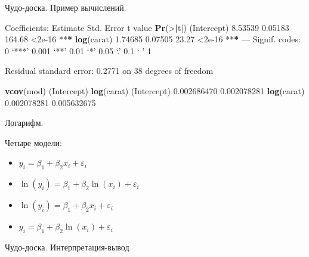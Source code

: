 \documentclass[ignorenonframetext,]{beamer}
\newenvironment{Shaded}{\begin{snugshade}}{\end{snugshade}}
\newcommand{\KeywordTok}[1]{\textcolor[rgb]{0.13,0.29,0.53}{\textbf{{#1}}}}
\newcommand{\DecValTok}[1]{\textcolor[rgb]{0.00,0.00,0.81}{{#1}}}
\newcommand{\FloatTok}[1]{\textcolor[rgb]{0.00,0.00,0.81}{{#1}}}
\newcommand{\StringTok}[1]{\textcolor[rgb]{0.31,0.60,0.02}{{#1}}}
\newcommand{\ErrorTok}[1]{\textbf{{#1}}}
\newcommand{\NormalTok}[1]{{#1}}
\begin{document}
\begin{frame}[fragile]{Чудо-доска. Пример вычислений.}

\begin{Shaded}
\begin{Highlighting}[]
\NormalTok{Coefficients:}
\StringTok{            }\NormalTok{Estimate Std. Error t value }\KeywordTok{Pr}\NormalTok{(>}\ErrorTok{|}\NormalTok{t|)    }
\NormalTok{(Intercept)  }\FloatTok{8.53539}    \FloatTok{0.05183}  \FloatTok{164.68}   \NormalTok{<}\FloatTok{2e-16} \NormalTok{**}\ErrorTok{*}
\KeywordTok{log}\NormalTok{(carat)   }\FloatTok{1.74685}    \FloatTok{0.07505}   \FloatTok{23.27}   \NormalTok{<}\FloatTok{2e-16} \NormalTok{**}\ErrorTok{*}
\NormalTok{---}
\NormalTok{Signif. codes:}\StringTok{  }\DecValTok{0} \NormalTok{‘***’ }\FloatTok{0.001} \NormalTok{‘**’ }\FloatTok{0.01} \NormalTok{‘*’ }\FloatTok{0.05} \NormalTok{‘.’ }\FloatTok{0.1} \NormalTok{‘ ’ }\DecValTok{1}

\NormalTok{Residual standard error:}\StringTok{ }\FloatTok{0.2771} \NormalTok{on }\DecValTok{38} \NormalTok{degrees of freedom}

\KeywordTok{vcov}\NormalTok{(mod)}
            \NormalTok{(Intercept)  }\KeywordTok{log}\NormalTok{(carat)}
\NormalTok{(Intercept) }\FloatTok{0.002686470} \FloatTok{0.002078281}
\KeywordTok{log}\NormalTok{(carat)  }\FloatTok{0.002078281} \FloatTok{0.005632675}
\end{Highlighting}
\end{Shaded}

\end{frame}

\begin{frame}{Логарифм.}

Четыре модели:

\begin{itemize}
\item
  $y_i = \beta_1 + \beta_2 x_i + \varepsilon_i$
\item
  $\ln( y_i) = \beta_1 + \beta_2 \ln( x_i) + \varepsilon_i$
\item
  $\ln( y_i) = \beta_1 + \beta_2 x_i + \varepsilon_i$
\item
  $y_i = \beta_1 + \beta_2 \ln( x_i) + \varepsilon_i$
\end{itemize}

\end{frame}

\begin{frame}{Чудо-доска. Интерпретация-вывод}

\end{frame}
\end{document}
